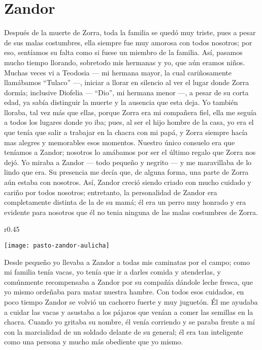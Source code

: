 \cleardoublepage
\newpage
\ifdefined\EnableIncludeImages
\fi
\chapter{Zandor}
Después de la muerte de Zorra, toda la familia se quedó muy triste, pues a pesar de sus malas costumbres, ella siempre fue muy amorosa con todos nosotros; por eso, sentíamos su falta como si fuese un miembro de la familia.
Así, pasamos mucho tiempo llorando, sobretodo mis hermanas y yo, que aún eramos niños.
Muchas veces vi a Teodosia --- mi hermana mayor, la cual cariñosamente llamábamos ``Tulaco'' ---, iniciar a llorar en silencio al ver el lugar donde Zorra dormía; inclusive Diofelia --- ``Dio'', mi hermana menor ---, a pesar de su corta edad, ya sabía distinguir la muerte y la ausencia que esta deja.
Yo también lloraba, tal vez más que ellas, porque Zorra era mi compañera fiel, ella me seguía a todos los lugares donde yo iba; pues, al ser el hijo hombre de la casa, yo era el que tenía que salir a trabajar en la chacra con mi papá, y Zorra siempre hacía mas alegres y memorables esos momentos.
Nuestro único consuelo era que teníamos a Zandor; nosotros lo amábamos por ser el último regalo que Zorra nos dejó.
Yo miraba a Zandor --- todo pequeño y negrito --- y me maravillaba de lo lindo que era. Su presencia me decía que, de alguna forma, una parte de Zorra aún estaba con nosotros.
Así, Zandor creció siendo criado con mucho cuidado y cariño por todos nosotros;
entretanto, la personalidad de Zandor era completamente distinta de la de su mamá; él era un perro muy honrado y era evidente para nosotros que él no tenia ninguna de las malas costumbres de Zorra.
\ifdefined\EnableIncludeImages
\begin{wrapfigure}{r}{0.45\textwidth}
  \begin{center}
  \vspace{-20pt}
    \texttt{[image: pasto-zandor-aulicha]}
  \end{center}
  \vspace{-20pt}
\end{wrapfigure}
\fi
Desde pequeño yo llevaba a Zandor a todas mis caminatas por el campo; como mi familia tenía vacas, yo tenía que ir a darles comida y atenderlas, y comúnmente recompensaba a Zandor por su compañía dándole leche fresca, que yo mismo ordeñaba para matar nuestra hambre.
Con todos esos cuidados, en poco tiempo Zandor se volvió un cachorro fuerte y muy juguetón.
Él me ayudaba a cuidar las vacas y asustaba a los pájaros que venían a comer las semillas en la chacra. Cuando yo gritaba su nombre, él venía corriendo y se paraba frente a mí con la marcialidad de un soldado delante de su general; él era tan inteligente como una persona y mucho más obediente que yo mismo.

